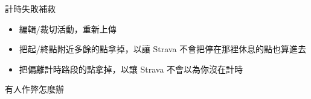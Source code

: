 \begin{frame}{計時失敗補救}
\begin{itemize}
\item 編輯/裁切活動，重新上傳
\item 把起/終點附近多餘的點拿掉，以讓 Strava 不會把停在那裡休息的點也算進去
\item 把偏離計時路段的點拿掉，以讓 Strava 不會以為你沒在計時
\end{itemize}
\end{frame}

\begin{frame}{有人作弊怎麼辦}
\begin{itemize}
\begin{multicols}{2}
\end{multicols}
\end{itemize}
\end{frame}
